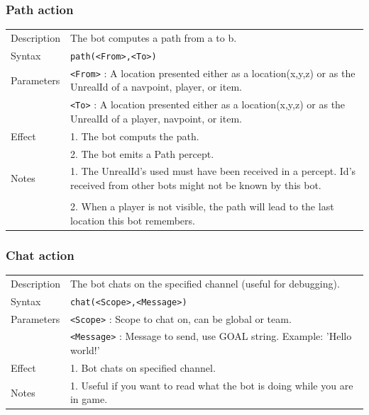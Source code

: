 \documentclass[11pt,a4paper]{article}
\begin{document}
\subsubsection*{Path action} 	
\begin{small}
\begin{tabular}{p{2cm}p{9cm}}
Description & The bot computes a path from a to b.\\
Syntax & \verb|path(<From>,<To>)|\\
Parameters 	& \verb|<From>| : A location presented either as a location(x,y,z) or as the UnrealId of a navpoint, player, or item.\\
	 	& \verb|<To>| :  A location presented either as a location(x,y,z) or as the UnrealId of a player, navpoint, or item.\\
Effect & 
		1.	The bot computs the path.\\
	&	2.	The bot emits a Path percept.\\
Notes& 
		1.	The UnrealId's used must have been received in a percept. Id's received from other bots might not be known by this bot. \\\\
	&	2.	When a player is not visible, the path will lead to the last location this bot remembers.\\
\end{tabular}
\end{small}

\subsubsection*{Chat action} 	
\begin{small}
    \begin{tabular}{p{2cm}p{9cm}}
        Description & The bot chats on the specified channel (useful for debugging).\\
        Syntax & \verb|chat(<Scope>,<Message>)|\\
        Parameters & \verb|<Scope>| : Scope to chat on, can be global or team.\\
            & \verb|<Message>| : Message to send, use GOAL string. Example: 'Hello world!'\\
        Effect &
            1. Bot chats on specified channel.\\
        Notes & 
            1. Useful if you want to read what the bot is doing while you are in game.\\
    \end{tabular}
\end{small}
\end{document}
